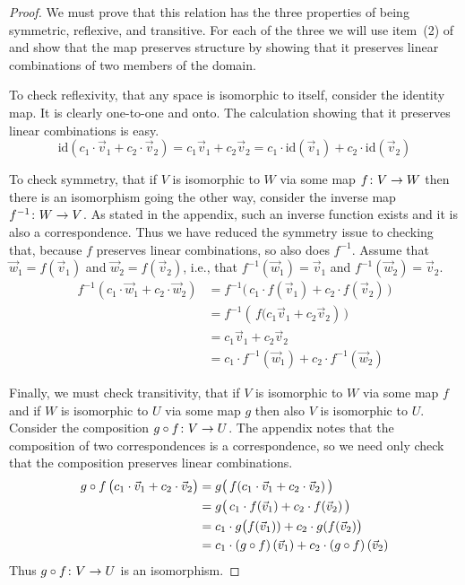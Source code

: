 \begin{proof}
We must prove that this relation has the three properties of being
symmetric, reflexive, and transitive.
For each of the three we will use item~(2) of 
 and show that the map preserves
structure by showing that it preserves linear combinations
of two members of the domain.

To check reflexivity, that any space is isomorphic to itself,
consider the identity map.
It is clearly one-to-one and onto.
The calculation showing that it preserves linear combinations is easy.
\begin{equation*}
   \mbox{id}(c_1\cdot \vec{v}_1+c_2\cdot \vec{v}_2)
   =c_1\vec{v}_1+c_2\vec{v}_2
   =c_1\cdot \mbox{id}(\vec{v}_1)+c_2\cdot \mbox{id}(\vec{v}_2)
\end{equation*}

To check symmetry, that if $V$ is isomorphic to $W$ via some 
map $\mbox{$f\colon V\to W$}$ then there is an isomorphism going the other way, 
consider the inverse map $\mbox{$f^{-1}\colon W\to V$}$. 
As stated in the appendix, such an inverse function exists and
it is also a correspondence.
Thus we have reduced the symmetry issue to checking that, because $f$ 
preserves linear combinations, so also does $f^{-1}$.
Assume that \( \vec{w}_1=f(\vec{v}_1) \) and \( \vec{w}_2=f(\vec{v}_2) \),
i.e., that \( f^{-1}(\vec{w}_1)=\vec{v}_1 \) 
and \( f^{-1}(\vec{w}_2)=\vec{v}_2 \).
\begin{align*}
  f^{-1}(c_1\cdot\vec{w}_1+c_2\cdot\vec{w}_2)
    &=f^{-1}\bigl(\,c_1\cdot f(\vec{v}_1)
                             +c_2\cdot f(\vec{v}_2)\,\bigr) \\
    &=f^{-1}(\,f\bigl(c_1\vec{v}_1+c_2\vec{v}_2)\,\bigr)    \\
    &=c_1\vec{v}_1+c_2\vec{v}_2                             \\ 
    &=c_1\cdot f^{-1}(\vec{w}_1)+c_2\cdot f^{-1}(\vec{w}_2)     
\end{align*}

Finally, we must check transitivity, that if $V$ is isomorphic to $W$ via some
map $f$ and if $W$ is isomorphic to $U$ via some map $g$ then also 
$V$ is isomorphic to $U$.
Consider the composition $\mbox{$g\mathbin\circ f\colon V\to U$}$.
The appendix notes that 
the composition of two correspondences is a correspondence, 
so we need only check that the composition preserves linear combinations.
\begin{align*}
  g\mathbin\circ f\,\bigl(c_1\cdot\vec{v}_1+c_2\cdot\vec{v}_2\bigr)
     &=g\bigl(\,f(c_1\cdot \vec{v}_1+c_2\cdot\vec{v}_2)\,\bigr)        \\
     &=g\bigl(\,c_1\cdot f(\vec{v}_1)+c_2\cdot f(\vec{v}_2)\,\bigr) \\ 
     &=c_1\cdot g\bigl(f(\vec{v}_1))+c_2\cdot g(f(\vec{v}_2)\bigr)  \\
     &=c_1\cdot(g\mathbin\circ f)\,(\vec{v}_1)
                  +c_2\cdot(g\mathbin\circ f)\,(\vec{v}_2)
\end{align*}
Thus \( \mbox{$g\mathbin\circ f\colon V\to U$}\) is an isomorphism.
\end{proof}

